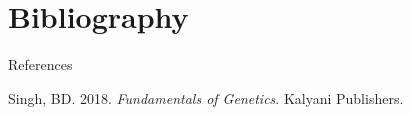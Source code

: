 \documentclass[11pt,dvipsnames,ignorenonframetext,aspectratio=169]{beamer}
\begin{document}
\hypertarget{bibliography}{%
\section{Bibliography}\label{bibliography}}

\begin{frame}{References}
\protect\hypertarget{references}{}

\hypertarget{refs}{}
\leavevmode\hypertarget{ref-singh2018fundamentals}{}%
Singh, BD. 2018. \emph{Fundamentals of Genetics}. Kalyani Publishers.

\end{frame}
\end{document}
